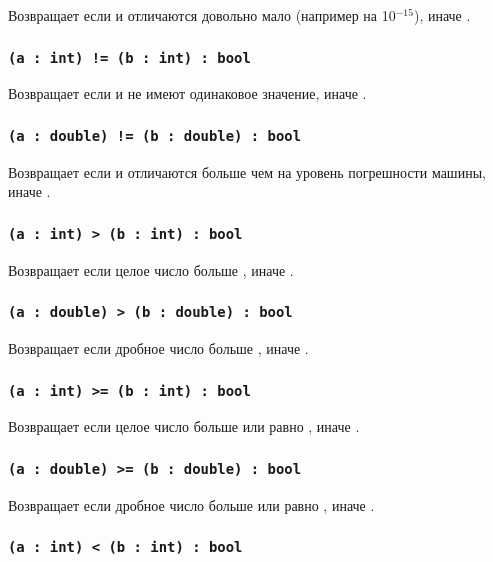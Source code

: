 Возвращает \true{} если  и  отличаются довольно мало (например на 10$^{-15}$), иначе \false{}.

\subsubsection{\lstinline|(a : int) != (b : int) : bool|}

Возвращает \true{} если  и  не имеют одинаковое значение, иначе \false{}.

\subsubsection{\lstinline|(a : double) != (b : double) : bool|}

Возвращает \true{} если  и  отличаются больше чем на уровень погрешности машины, иначе \false{}.

\subsubsection{\lstinline|(a : int) > (b : int) : bool|}

Возвращает \true{} если целое число  больше , иначе \false{}.

\subsubsection{\lstinline|(a : double) > (b : double) : bool|}

Возвращает \true{} если дробное число  больше , иначе \false{}.

\subsubsection{\lstinline|(a : int) >= (b : int) : bool|}

Возвращает \true{} если целое число  больше или равно , иначе \false{}.

\subsubsection{\lstinline|(a : double) >= (b : double) : bool|}

Возвращает \true{} если дробное число  больше или равно , иначе \false{}.

\subsubsection{\lstinline|(a : int) < (b : int) : bool|}

